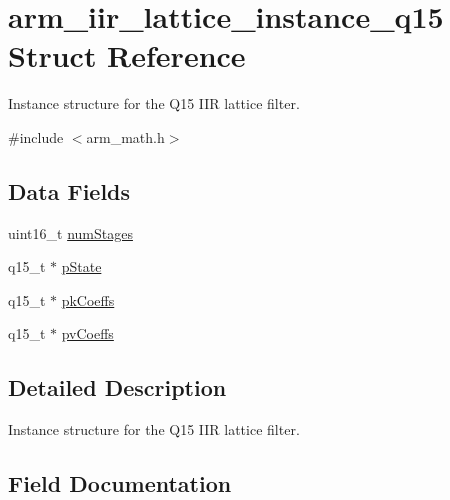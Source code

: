 \hypertarget{structarm__iir__lattice__instance__q15}{}\section{arm\+\_\+iir\+\_\+lattice\+\_\+instance\+\_\+q15 Struct Reference}
\label{structarm__iir__lattice__instance__q15}


Instance structure for the Q15 I\+IR lattice filter.  




{\ttfamily \#include $<$arm\+\_\+math.\+h$>$}

\subsection*{Data Fields}
\begin{DoxyCompactItemize}
\item 
uint16\+\_\+t \hyperlink{structarm__iir__lattice__instance__q15_a4cceb90547b3e585d4c7aabaa8057212}{num\+Stages}
\item 
q15\+\_\+t $\ast$ \hyperlink{structarm__iir__lattice__instance__q15_ae29dfdb736374fcddaeaec4b7770170c}{p\+State}
\item 
q15\+\_\+t $\ast$ \hyperlink{structarm__iir__lattice__instance__q15_a12497c299b0341c18d497f8ab3465084}{pk\+Coeffs}
\item 
q15\+\_\+t $\ast$ \hyperlink{structarm__iir__lattice__instance__q15_a52866ed127c7b2a8a102e2ed1a2ebab8}{pv\+Coeffs}
\end{DoxyCompactItemize}


\subsection{Detailed Description}
Instance structure for the Q15 I\+IR lattice filter. 

\subsection{Field Documentation}
\mbox{\label{structarm__iir__lattice__instance__q15_a4cceb90547b3e585d4c7aabaa8057212}} 
